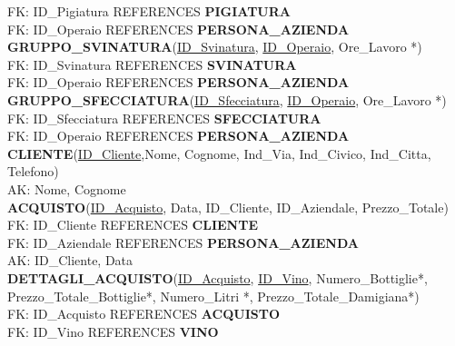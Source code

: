 \documentclass{article}
\begin{document}
FK: ID\_Pigiatura REFERENCES \textbf{PIGIATURA}\\
FK: ID\_Operaio REFERENCES \textbf{PERSONA\_AZIENDA}\\\newline
\textbf{GRUPPO\_SVINATURA}(\underline{ID\_Svinatura}, \underline{ID\_Operaio}, Ore\_Lavoro *)\\
FK: ID\_Svinatura REFERENCES \textbf{SVINATURA}\\
FK: ID\_Operaio REFERENCES \textbf{PERSONA\_AZIENDA}\\\newline
\textbf{GRUPPO\_SFECCIATURA}(\underline{ID\_Sfecciatura}, \underline{ID\_Operaio}, Ore\_Lavoro *)\\
FK: ID\_Sfecciatura REFERENCES \textbf{SFECCIATURA}\\
FK: ID\_Operaio REFERENCES \textbf{PERSONA\_AZIENDA}\\\newline
\textbf{CLIENTE}(\underline{ID\_Cliente},Nome, Cognome, Ind\_Via, Ind\_Civico, Ind\_Citta, Telefono)\\
AK: Nome, Cognome\\\newline
\textbf{ACQUISTO}(\underline{ID\_Acquisto}, Data, ID\_Cliente, ID\_Aziendale, Prezzo\_Totale)\\
FK: ID\_Cliente REFERENCES \textbf{CLIENTE}\\
FK: ID\_Aziendale REFERENCES \textbf{PERSONA\_AZIENDA}\\
AK: ID\_Cliente, Data\\\newline
\textbf{DETTAGLI\_ACQUISTO}(\underline{ID\_Acquisto}, \underline{ID\_Vino}, Numero\_Bottiglie*, Prezzo\_Totale\_Bottiglie*, Numero\_Litri *,  Prezzo\_Totale\_Damigiana*)\\
FK: ID\_Acquisto REFERENCES \textbf{ACQUISTO}\\
FK: ID\_Vino REFERENCES \textbf{VINO}
\end{document}
